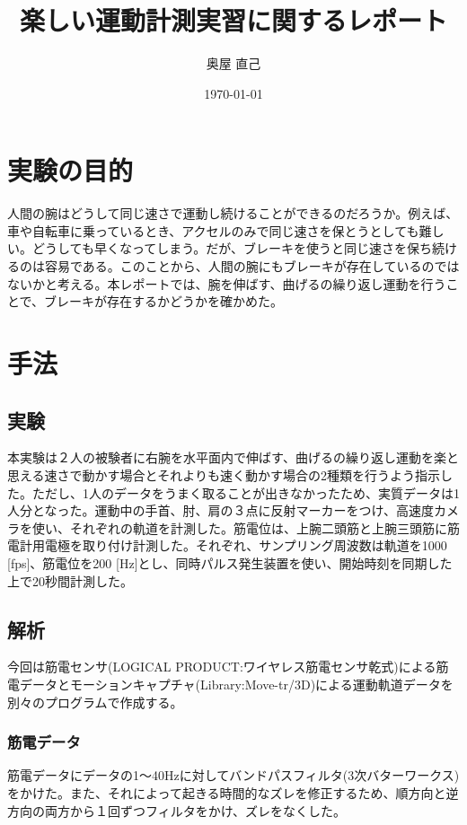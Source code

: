 \documentclass{jsarticle}
\title{楽しい運動計測実習に関するレポート}
\date{\today}
\author{奥屋 直己}
\begin{document}
\maketitle

\section{実験の目的}

人間の腕はどうして同じ速さで運動し続けることができるのだろうか。例えば、車や自転車に乗っているとき、アクセルのみで同じ速さを保とうとしても難しい。どうしても早くなってしまう。だが、ブレーキを使うと同じ速さを保ち続けるのは容易である。このことから、人間の腕にもブレーキが存在しているのではないかと考える。本レポートでは、腕を伸ばす、曲げるの繰り返し運動を行うことで、ブレーキが存在するかどうかを確かめた。

\section{手法}

\subsection{実験}

本実験は２人の被験者に右腕を水平面内で伸ばす、曲げるの繰り返し運動を楽と思える速さで動かす場合とそれよりも速く動かす場合の2種類を行うよう指示した。ただし、1人のデータをうまく取ることが出きなかったため、実質データは1人分となった。運動中の手首、肘、肩の３点に反射マーカーをつけ、高速度カメラを使い、それぞれの軌道を計測した。筋電位は、上腕二頭筋と上腕三頭筋に筋電計用電極を取り付け計測した。それぞれ、サンプリング周波数は軌道を1000 [fps]、筋電位を200 [Hz]とし、同時パルス発生装置を使い、開始時刻を同期した上で20秒間計測した。
\subsection{解析}

今回は筋電センサ(LOGICAL PRODUCT:ワイヤレス筋電センサ乾式)による筋電データとモーションキャプチャ(Library:Move-tr/3D)による運動軌道データを別々のプログラムで作成する。

\subsubsection{筋電データ}

筋電データにデータの1〜40Hzに対してバンドパスフィルタ(3次バターワークス)をかけた。また、それによって起きる時間的なズレを修正するため、順方向と逆方向の両方から１回ずつフィルタをかけ、ズレをなくした。
\end{document}
